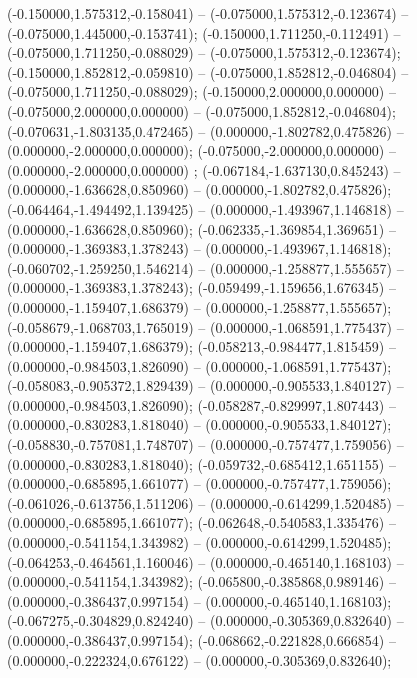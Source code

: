  (-0.150000,1.575312,-0.158041) -- (-0.075000,1.575312,-0.123674) -- (-0.075000,1.445000,-0.153741);
 (-0.150000,1.711250,-0.112491) -- (-0.075000,1.711250,-0.088029) -- (-0.075000,1.575312,-0.123674);
 (-0.150000,1.852812,-0.059810) -- (-0.075000,1.852812,-0.046804) -- (-0.075000,1.711250,-0.088029);
 (-0.150000,2.000000,0.000000) -- (-0.075000,2.000000,0.000000) -- (-0.075000,1.852812,-0.046804);
 (-0.070631,-1.803135,0.472465) -- (0.000000,-1.802782,0.475826) -- (0.000000,-2.000000,0.000000);
 (-0.075000,-2.000000,0.000000) -- (0.000000,-2.000000,0.000000) ;
 (-0.067184,-1.637130,0.845243) -- (0.000000,-1.636628,0.850960) -- (0.000000,-1.802782,0.475826);
 (-0.064464,-1.494492,1.139425) -- (0.000000,-1.493967,1.146818) -- (0.000000,-1.636628,0.850960);
 (-0.062335,-1.369854,1.369651) -- (0.000000,-1.369383,1.378243) -- (0.000000,-1.493967,1.146818);
 (-0.060702,-1.259250,1.546214) -- (0.000000,-1.258877,1.555657) -- (0.000000,-1.369383,1.378243);
 (-0.059499,-1.159656,1.676345) -- (0.000000,-1.159407,1.686379) -- (0.000000,-1.258877,1.555657);
 (-0.058679,-1.068703,1.765019) -- (0.000000,-1.068591,1.775437) -- (0.000000,-1.159407,1.686379);
 (-0.058213,-0.984477,1.815459) -- (0.000000,-0.984503,1.826090) -- (0.000000,-1.068591,1.775437);
 (-0.058083,-0.905372,1.829439) -- (0.000000,-0.905533,1.840127) -- (0.000000,-0.984503,1.826090);
 (-0.058287,-0.829997,1.807443) -- (0.000000,-0.830283,1.818040) -- (0.000000,-0.905533,1.840127);
 (-0.058830,-0.757081,1.748707) -- (0.000000,-0.757477,1.759056) -- (0.000000,-0.830283,1.818040);
 (-0.059732,-0.685412,1.651155) -- (0.000000,-0.685895,1.661077) -- (0.000000,-0.757477,1.759056);
 (-0.061026,-0.613756,1.511206) -- (0.000000,-0.614299,1.520485) -- (0.000000,-0.685895,1.661077);
 (-0.062648,-0.540583,1.335476) -- (0.000000,-0.541154,1.343982) -- (0.000000,-0.614299,1.520485);
 (-0.064253,-0.464561,1.160046) -- (0.000000,-0.465140,1.168103) -- (0.000000,-0.541154,1.343982);
 (-0.065800,-0.385868,0.989146) -- (0.000000,-0.386437,0.997154) -- (0.000000,-0.465140,1.168103);
 (-0.067275,-0.304829,0.824240) -- (0.000000,-0.305369,0.832640) -- (0.000000,-0.386437,0.997154);
 (-0.068662,-0.221828,0.666854) -- (0.000000,-0.222324,0.676122) -- (0.000000,-0.305369,0.832640);
